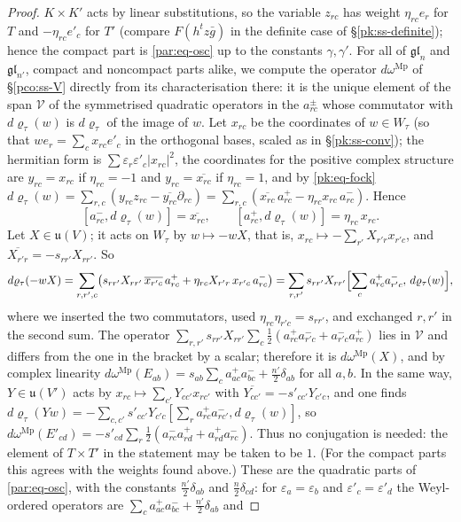 \documentclass[10pt]{amsart}
\theoremstyle{definition}
\theoremstyle{remark}
\begin{document}
\begin{proof}
$K\times K'$ acts by linear substitutions, so the variable $z_{rc}$ has weight $\eta_{rc}e_r$ for
$T$ and $-\eta_{rc}e'_c$ for $T'$ (compare $F(h^tz\bar g)$ in the definite case of
\S\ref{pk:ss-definite}); hence the compact part is \eqref{par:eq-osc} up to the constants
$\gamma,\gamma'$. For all of $\mathfrak{gl}_n$ and $\mathfrak{gl}_{n'}$, compact and noncompact parts alike, we compute the operator $d\omega^{\mathrm{Mp}}$ of \S\ref{pco:ss-V} directly from its characterisation there: it is the unique element of the span $\mathcal V$ of the symmetrised quadratic operators in the $a^\pm_{rc}$ whose commutator with $d\varrho_\tau(w)$ is $d\varrho_\tau$ of the image of $w$. Let $x_{rc}$ be the coordinates of $w\in W_\tau$ (so that $we_r=\sum_cx_{rc}e'_c$ in the orthogonal bases, scaled as in \S\ref{pk:ss-conv}); the hermitian form is $\sum\varepsilon_r\varepsilon'_c|x_{rc}|^2$, the coordinates for the positive complex structure are $y_{rc}=x_{rc}$ if $\eta_{rc}=-1$ and $y_{rc}=\overline{x_{rc}}$ if $\eta_{rc}=1$, and by \eqref{pk:eq-fock} $d\varrho_\tau(w)=\sum_{r,c}(y_{rc}z_{rc}-\overline{y_{rc}}\partial_{rc})=\sum_{r,c}(\overline{x_{rc}}\,a^+_{rc}-\eta_{rc}x_{rc}\,a^-_{rc})$. Hence
\[
[a^-_{rc},d\varrho_\tau(w)]=\overline{x_{rc}},\qquad[a^+_{rc},d\varrho_\tau(w)]=\eta_{rc}\,x_{rc}.
\]
Let $X\in\mathfrak u(V)$; it acts on $W_\tau$ by $w\mapsto-wX$, that is, $x_{rc}\mapsto-\sum_{r'}X_{r'r}x_{r'c}$, and $\overline{X_{r'r}}=-s_{rr'}X_{rr'}$. So
\[
d\varrho_\tau(-wX)=\sum_{r,r',c}\bigl(s_{rr'}X_{rr'}\,\overline{x_{r'c}}\,a^+_{rc}+\eta_{rc}X_{r'r}\,x_{r'c}\,a^-_{rc}\bigr)
=\sum_{r,r'}s_{rr'}X_{rr'}\Bigl[\sum_ca^+_{rc}a^-_{r'c},\,d\varrho_\tau(w)\Bigr],
\]
where we inserted the two commutators, used $\eta_{rc}\eta_{r'c}=s_{rr'}$, and exchanged $r,r'$ in the second sum. The operator $\sum_{r,r'}s_{rr'}X_{rr'}\sum_c\frac12(a^+_{rc}a^-_{r'c}+a^-_{r'c}a^+_{rc})$ lies in $\mathcal V$ and differs from the one in the bracket by a scalar; therefore it is $d\omega^{\mathrm{Mp}}(X)$, and by complex linearity $d\omega^{\mathrm{Mp}}(E_{ab})=s_{ab}\sum_ca^+_{ac}a^-_{bc}+\frac{n'}2\delta_{ab}$ for all $a,b$. In the same way, $Y\in\mathfrak u(V')$ acts by $x_{rc}\mapsto\sum_{c'}Y_{cc'}x_{rc'}$ with $\overline{Y_{cc'}}=-s'_{cc'}Y_{c'c}$, and one finds $d\varrho_\tau(Yw)=-\sum_{c,c'}s'_{cc'}Y_{c'c}[\sum_ra^+_{rc}a^-_{rc'},d\varrho_\tau(w)]$, so $d\omega^{\mathrm{Mp}}(E'_{cd})=-s'_{cd}\sum_r\frac12(a^-_{rc}a^+_{rd}+a^+_{rd}a^-_{rc})$. Thus no conjugation is needed: the element of $T\times T'$ in the statement may be taken to be $1$. (For the compact parts this agrees with the weights found above.) These are the quadratic parts of \eqref{par:eq-osc}, with the constants $\tfrac{n'}2\delta_{ab}$ and $\tfrac n2\delta_{cd}$: for $\varepsilon_a=\varepsilon_b$ and $\varepsilon'_c=\varepsilon'_d$ the Weyl-ordered operators are $\sum_ca^+_{ac}a^-_{bc}+\tfrac{n'}2\delta_{ab}$ and

\end{proof}
\end{document}
